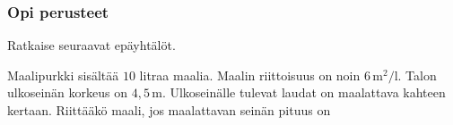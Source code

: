 \begin{tehtavasivu}

\subsubsection*{Opi perusteet}
%
%
%
%
%

\begin{tehtava}
    Ratkaise seuraavat epäyhtälöt.
    \begin{vastaus}
    \end{vastaus}
\end{tehtava}

\begin{tehtava}
Maalipurkki sisältää $10$ litraa maalia. Maalin riittoisuus on noin $6\,\text{m}^2/\text{l}$. Talon ulkoseinän korkeus on $4,5$\,m. Ulkoseinälle tulevat laudat on maalattava kahteen kertaan. Riittääkö maali, jos maalattavan seinän pituus on
	\begin{vastaus}


\end{vastaus}
\end{tehtava}
\end{tehtavasivu}
